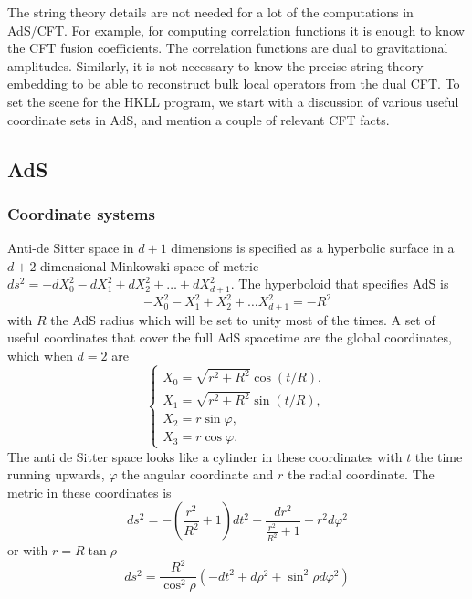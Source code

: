 \documentclass{PoS}
\newcommand{\LF}{\left(}
\newcommand{\RF}{\right)}
\begin{document}
The string theory details are not needed for a lot of the computations in AdS/CFT. For example, for computing correlation functions it is enough to know the CFT fusion coefficients. The correlation functions are dual to gravitational amplitudes. Similarly, it is not necessary to know the precise string theory embedding to be able to reconstruct bulk local operators from the dual CFT. To set the scene for the HKLL program, we start with a discussion of various useful coordinate sets in AdS, and mention a couple of relevant CFT facts.

\subsection{AdS}
\subsubsection{Coordinate systems}
Anti-de Sitter space in $d+1$ dimensions is specified as a hyperbolic surface in a $d+2$ dimensional Minkowski space of metric $ds^2 = -dX_0^2 - dX_1^2 + dX_2^2 + \ldots + dX_{d+1}^2$. The hyperboloid that specifies AdS is
\begin{equation}
-X_0^2 - X_1^2 + X_2^2 + \ldots X_{d+1}^2 =- R^2
\end{equation}
with $R$ the AdS radius which will be set to unity most of the times. A set of useful coordinates that cover the full AdS spacetime are the global coordinates, which when $d=2$ are
\begin{equation}
\left\{ \begin{matrix}
X_0 = \sqrt{r^2+R^2} \cos (t/R),\\
X_1 = \sqrt{r^2+R^2} \sin(t/R),\\
X_2 =  r \sin\varphi,\\
X_3 =  r\cos\varphi.
\end{matrix}
\right.
\end{equation}  
The anti de Sitter space looks like a cylinder in these coordinates with $t$ the time running upwards, $\varphi$ the angular coordinate and $r$ the radial coordinate. The metric in these coordinates is
\begin{equation}
ds^2 = -(\frac{r^2}{R^2}+1)dt^2 + \frac{dr^2}{\frac{r^2}{R^2}+1} + r^2d\varphi^2
\end{equation} 
or with $r= R\tan\rho$
\begin{equation}
ds^2 = \frac{R^2}{\cos^2\rho} \LF - dt^2  + d\rho^2 + \sin^2\rho d\varphi^2\RF
\label{eq:globalcoord}
\end{equation}
\end{document}
